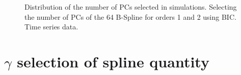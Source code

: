 \documentclass[
]{article}
\begin{document}
\begin{figure}

\begin{minipage}[t]{0.50\linewidth}

{\centering 


}

\end{minipage}%
%
\begin{minipage}[t]{0.50\linewidth}

{\centering 


}

\end{minipage}%

\caption{\label{fig-pc-ts}Distribution of the number of PCs selected in
simulations. Selecting the number of PCs of the 64 B-Spline for orders 1
and 2 using BIC. Time series data.}

\end{figure}

\hypertarget{gamma-selection-of-spline-quantity}{%
\section{\texorpdfstring{\(\gamma\) selection of spline
quantity}{\textbackslash gamma selection of spline quantity}}\label{gamma-selection-of-spline-quantity}}
\end{document}
